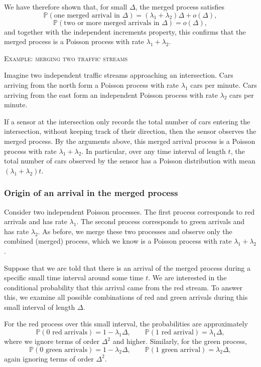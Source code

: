 We have therefore shown that, for small \(\Delta\), the merged process satisfies
\[
\mathbb{P}(\text{one merged arrival in } \Delta)
=
(\lambda_1 + \lambda_2)\Delta + o(\Delta),
\]
\[
\mathbb{P}(\text{two or more merged arrivals in } \Delta)
=
o(\Delta),
\]
and together with the independent increments property, this confirms that the merged process is a Poisson process with rate \(\lambda_1 + \lambda_2\).  

\bigskip
\textsc{Example: merging two traffic streams}

Imagine two independent traffic streams approaching an intersection.  
Cars arriving from the north form a Poisson process with rate \(\lambda_1\) cars per minute.  
Cars arriving from the east form an independent Poisson process with rate \(\lambda_2\) cars per minute.  

If a sensor at the intersection only records the total number of cars entering the intersection, without keeping track of their direction, then the sensor observes the merged process.  
By the arguments above, this merged arrival process is a Poisson process with rate \(\lambda_1 + \lambda_2\).  
In particular, over any time interval of length \(t\), the total number of cars observed by the sensor has a Poisson distribution with mean \((\lambda_1 + \lambda_2)t\).

\subsubsection{Origin of an arrival in the merged process}

Consider two independent Poisson processes.  
The first process corresponds to red arrivals and has rate \(\lambda_1\).  
The second process corresponds to green arrivals and has rate \(\lambda_2\).  
As before, we merge these two processes and observe only the combined (merged) process, which we know is a Poisson process with rate \(\lambda_1 + \lambda_2\).  

Suppose that we are told that there is an arrival of the merged process during a specific small time interval around some time \(t\).  
We are interested in the conditional probability that this arrival came from the red stream.  
To answer this, we examine all possible combinations of red and green arrivals during this small interval of length \(\Delta\).  

For the red process over this small interval, the probabilities are approximately
\[
\mathbb{P}(\text{0 red arrivals}) = 1 - \lambda_1 \Delta,
\qquad
\mathbb{P}(\text{1 red arrival}) = \lambda_1 \Delta,
\]
where we ignore terms of order \(\Delta^2\) and higher.  
Similarly, for the green process,
\[
\mathbb{P}(\text{0 green arrivals}) = 1 - \lambda_2 \Delta,
\qquad
\mathbb{P}(\text{1 green arrival}) = \lambda_2 \Delta,
\]
again ignoring terms of order \(\Delta^2\).  

